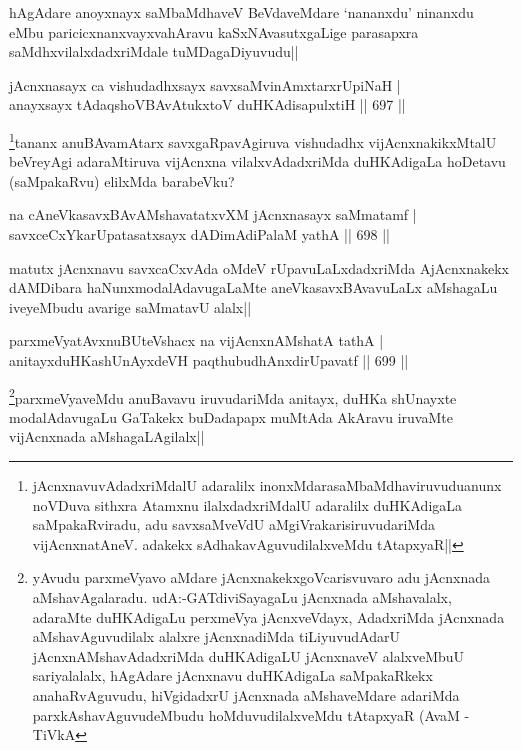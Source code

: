 \begin{artha}
hAgAdare anoyxnayx saMbaMdhaveV BeVdaveMdare `nananxdu' ninanxdu eMbu paricicxnanxvayxvahAravu kaSxNAvasutxgaLige parasapxra saMdhxvilalxdadxriMdale tuMDagaDiyuvudu||
\end{artha}


\begin{shl}
jAcnxnasayx ca vishudadhxsayx savxsaMvinAmxtarxrUpiNaH | \\
anayxsayx tAdaqshoV\s BAvAtukxtoV duHKAdisapulxtiH \hfill||  697 ||  
\end{shl}

\begin{artha}
\footnote{jAcnxnavuvAdadxriMdalU adaralilx inonxMdarasaMbaMdhaviruvuduanunx noVDuva sithxra Atamxnu ilalxdadxriMdalU adaralilx duHKAdigaLa saMpakaRviradu, adu savxsaMveVdU aMgiVrakarisiruvudariMda vijAcnxnatAneV. adakekx sAdhakavAguvudilalxveMdu tAtapxyaR||}tananx anuBAvamAtarx savxgaRpavAgiruva vishudadhx vijAcnxnakikxMtalU beVreyAgi adaraMtiruva vijAcnxna vilalxvAdadxriMda duHKAdigaLa hoDetavu (saMpakaRvu) elilxMda barabeVku?
\end{artha}

\begin{shl}
na cAneVkasavxBAvAMshavatatxvXM jAcnxnasayx saMmatamf | \\
savxceCxYkarUpatasatxsayx dADimAdiPalaM yathA \hfill||  698 ||  
\end{shl}

\begin{artha}
matutx jAcnxnavu savxcaCxvAda oMdeV rUpavuLaLxdadxriMda AjAcnxnakekx dAMDibara haNunxmodalAdavugaLaMte aneVkasavxBAvavuLaLx aMshagaLu iveyeMbudu avarige saMmatavU alalx||
\end{artha}

\begin{shl}
parxmeVyatAvxnuBUteVshacx na vijAcnxnAMshatA tathA | \\
anitayxduHKashUnAyxdeVH paqthubudhAnxdirUpavatf \hfill||  699 ||  
\end{shl}

\begin{artha}
\footnote{yAvudu parxmeVyavo aMdare jAcnxnakekxgoVcarisvuvaro adu jAcnxnada aMshavAgalaradu. udA:-GATdiviSayagaLu jAcnxnada aMshavalalx, adaraMte duHKAdigaLu perxmeVya jAcnxveVdayx, AdadxriMda jAcnxnada aMshavAguvudilalx alalxre jAcnxnadiMda tiLiyuvudAdarU jAcnxnAMshavAdadxriMda duHKAdigaLU jAcnxnaveV alalxveMbuU sariyalalalx, hAgAdare jAcnxnavu duHKAdigaLa saMpakaRkekx anahaRvAguvudu, hiVgidadxrU jAcnxnada aMshaveMdare adariMda parxkAshavAguvudeMbudu hoMduvudilalxveMdu tAtapxyaR (AvaM -TiVkA}parxmeVyaveMdu anuBavavu iruvudariMda anitayx, duHKa shUnayxte modalAdavugaLu GaTakekx buDadapapx muMtAda AkAravu iruvaMte vijAcnxnada aMshagaLAgilalx||
\end{artha}

